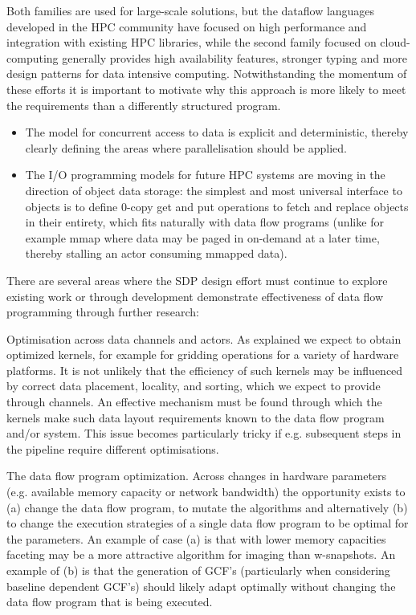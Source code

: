 \documentclass[11pt,a4paper]{article}
\begin{document}
Both families are used for large-scale solutions, but the dataflow
languages developed in the HPC community have focused on high
performance and integration with existing HPC libraries, while the
second family focused on cloud-computing generally provides high
availability features, stronger typing and more design patterns for
data intensive computing.  Notwithstanding the momentum of these
efforts it is important to motivate why this approach is more likely
to meet the requirements than a differently structured program.

\begin{itemize}
\item The model for concurrent access to data is
explicit and deterministic, thereby clearly defining the areas where
parallelisation should be applied.  
\item The I/O programming models for future HPC systems are moving in
  the direction of object data storage: the simplest and most
  universal interface to objects is to define 0-copy get and put
  operations to fetch and replace objects in their entirety, which
  fits naturally with data flow programs (unlike for example mmap
  where data may be paged in on-demand at a later time, thereby
  stalling an actor consuming mmapped data).
\end{itemize}

There are several areas where the SDP design effort must continue to
explore existing work or through development demonstrate effectiveness
of data flow programming through further research:

Optimisation across data channels and actors.  As explained we expect
to obtain optimized kernels, for example for gridding operations for a
variety of hardware platforms.  It is not unlikely that the efficiency
of such kernels may be influenced by correct data placement, locality,
and sorting, which we expect to provide through channels.  An
effective mechanism must be found through which the kernels make such
data layout requirements known to the data flow program and/or
system. This issue becomes particularly tricky if e.g. subsequent
steps in the pipeline require different optimisations.

The data flow program optimization.  Across changes in hardware
parameters (e.g. available memory capacity or network bandwidth) the
opportunity exists to (a) change the data flow program, to mutate the
algorithms and alternatively (b) to change the execution strategies of
a single data flow program to be optimal for the parameters.  An
example of case (a) is that with lower memory capacities faceting may
be a more attractive algorithm for imaging than w-snapshots.  An
example of (b) is that the generation of GCF’s (particularly when
considering baseline dependent GCF’s) should likely adapt optimally
without changing the data flow program that is being executed.
\end{document}
